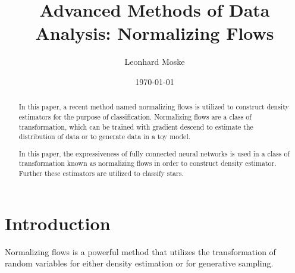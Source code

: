 \documentclass[%
 reprint,
 amsmath,amssymb,
 aps,
]{revtex4-2}
\begin{document}
\title{Advanced Methods of Data Analysis: Normalizing Flows}%

\author{Leonhard Moske}



\date{\today}%

\begin{abstract}

In this paper, a recent method named normalizing flows is utilized to construct density estimators for the purpose of classification. Normalizing flows are a class of transformation, which can be trained with gradient descend to estimate the distribution of data or to generate data in a toy model.

In this paper, the expressiveness of fully connected neural networks is used in a class of transformation known as normalizing flows in order to construct density estimator. Further these estimators are utilized to classify stars.

\end{abstract}
\maketitle


\section{Introduction}
Normalizing flows is a powerful method that utilizes the transformation of random variables for either density estimation or for generative sampling.
\end{document}
